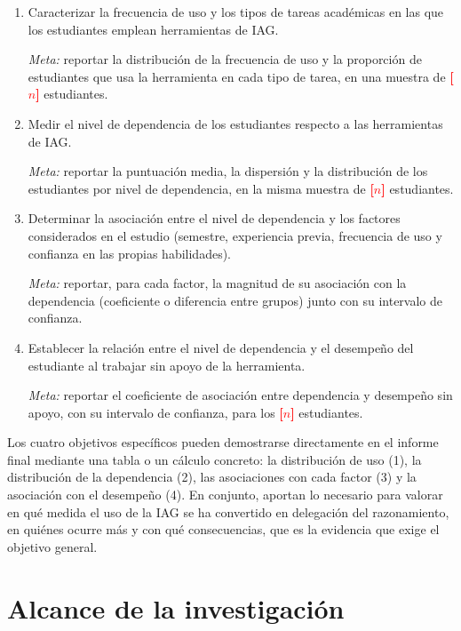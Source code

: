 \documentclass[12pt,a4paper,oneside]{report}
\newcommand{\pendiente}[1]{\textcolor{red}{\textbf{[#1]}}}
\begin{document}
\begin{enumerate}
  \item Caracterizar la frecuencia de uso y los tipos de tareas académicas en las que los estudiantes emplean herramientas de IAG.

  \textit{Meta:} reportar la distribución de la frecuencia de uso y la proporción de estudiantes que usa la herramienta en cada tipo de tarea, en una muestra de \pendiente{$n$} estudiantes.

  \item Medir el nivel de dependencia de los estudiantes respecto a las herramientas de IAG.

  \textit{Meta:} reportar la puntuación media, la dispersión y la distribución de los estudiantes por nivel de dependencia, en la misma muestra de \pendiente{$n$} estudiantes.

  \item Determinar la asociación entre el nivel de dependencia y los factores considerados en el estudio (semestre, experiencia previa, frecuencia de uso y confianza en las propias habilidades).

  \textit{Meta:} reportar, para cada factor, la magnitud de su asociación con la dependencia (coeficiente o diferencia entre grupos) junto con su intervalo de confianza.

  \item Establecer la relación entre el nivel de dependencia y el desempeño del estudiante al trabajar sin apoyo de la herramienta.

  \textit{Meta:} reportar el coeficiente de asociación entre dependencia y desempeño sin apoyo, con su intervalo de confianza, para los \pendiente{$n$} estudiantes.
\end{enumerate}

Los cuatro objetivos específicos pueden demostrarse directamente en el informe final mediante una tabla o un cálculo concreto: la distribución de uso (1), la distribución de la dependencia (2), las asociaciones con cada factor (3) y la asociación con el desempeño (4). En conjunto, aportan lo necesario para valorar en qué medida el uso de la IAG se ha convertido en delegación del razonamiento, en quiénes ocurre más y con qué consecuencias, que es la evidencia que exige el objetivo general.

\chapter{Alcance de la investigación}
\end{document}
